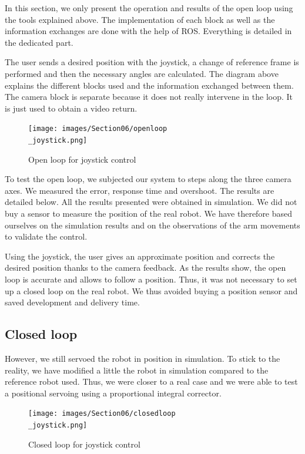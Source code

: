 \hspace{\parindent} In this section, we only present the operation and results of the open loop using the tools explained above. The implementation of each block as well as the information exchanges are done with the help of ROS. Everything is detailed in the dedicated part.

\bigbreak
The user sends a desired position with the joystick, a change of reference frame is performed and then the necessary angles are calculated. The diagram above explains the different blocks used and the information exchanged between them. The camera block is separate because it does not really intervene in the loop. It is just used to obtain a video return.
\begin{figure}[ht]
    \centering
    \texttt{[image: images/Section06/openloop\\\_joystick.png]}
    \caption{Open loop for joystick control}
    \label{fig:mesh19}
\end{figure}
\FloatBarrier

\bigbreak 
To test the open loop, we subjected our system to steps along the three camera axes. We measured the error, response time and overshoot. The results are detailed below. All the results presented were obtained in simulation. We did not buy a sensor to measure the position of the real robot. We have therefore based ourselves on the simulation results and on the observations of the arm movements to validate the control.

\bigbreak
Using the joystick, the user gives an approximate position and corrects the desired position thanks to the camera feedback. As the results show, the open loop is accurate and allows to follow a position. Thus, it was not necessary to set up a closed loop on the real robot. We thus avoided buying a position sensor and saved development and delivery time.

\subsection{Closed loop}


\hspace{\parindent} However, we still servoed the robot in position in simulation. To stick to the reality, we have modified a little the robot in simulation compared to the reference robot used. Thus, we were closer to a real case and we were able to test a positional servoing using a proportional integral corrector.

\begin{figure}[ht]
    \centering
    \texttt{[image: images/Section06/closedloop\\\_joystick.png]}
    \caption{Closed loop for joystick control}
    \label{fig:mesh20}
\end{figure}
\FloatBarrier